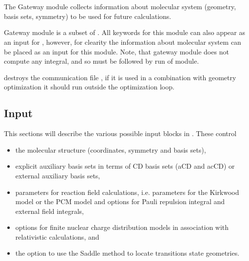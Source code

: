 
\section{}
\label{UG:sec:gateway}

The Gateway module collects information about molecular
system (geometry, basis sets, symmetry) to be used for future calculations.

Gateway module is a subset of . All keywords
for this module can also appear as an input for , however,
for clearity the information about molecular system can be placed
as an input for this module. Note, that gateway module does not
compute any integral, and so must be followed by run of 
module.

 destroys the communication file ,
if it is used in a combination with geometry optimization it should run
outside the optimization loop.

\subsection{Input}
This sections will describe the various possible input blocks in .
These control
\begin{itemize}
\item
the molecular structure (coordinates, symmetry and basis sets),
\item
explicit auxiliary basis sets in terms of CD basis sets (aCD and acCD) or
external auxiliary basis sets,
\item
parameters for reaction field calculations, i.e. parameters for the Kirkwood model
or the PCM model and options for Pauli repulsion integral and external field integrals,
\item
options for finite nuclear charge distribution models in association with relativistic calculations, and
\item
the option to use the Saddle method to locate transitions state geometries.
\end{itemize}

